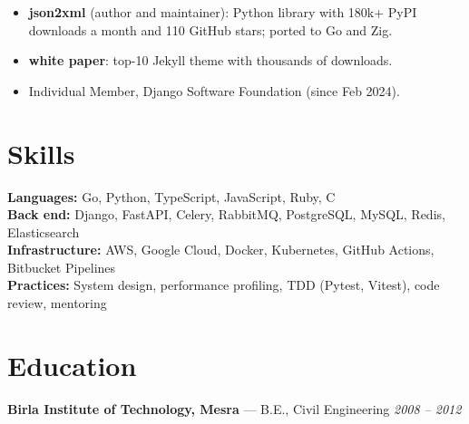 \documentclass[10pt,a4paper]{article}
\newenvironment{points}
  {\begin{itemize}[leftmargin=1.4em, itemsep=0.5pt, topsep=2pt, parsep=0pt]}
  {\end{itemize}}
\begin{document}
\begin{points}
  \item \textbf{json2xml} (author and maintainer): Python library with 180k+
        PyPI downloads a month and 110 GitHub stars; ported to Go and Zig.
  \item \textbf{white paper}: top-10 Jekyll theme with thousands of
        downloads.
  \item Individual Member, Django Software Foundation (since Feb 2024).
\end{points}

\section*{Skills}

\textbf{Languages:} Go, Python, TypeScript, JavaScript, Ruby, C \\
\textbf{Back end:} Django, FastAPI, Celery, RabbitMQ,
PostgreSQL, MySQL, Redis, Elasticsearch \\
\textbf{Infrastructure:} AWS, Google Cloud, Docker, Kubernetes, GitHub Actions,
Bitbucket Pipelines \\
\textbf{Practices:} System design, performance profiling, TDD (Pytest, Vitest),
code review, mentoring

\section*{Education}

\textbf{Birla Institute of Technology, Mesra} --- B.E., Civil Engineering
\hfill\textit{2008 -- 2012}
\end{document}
